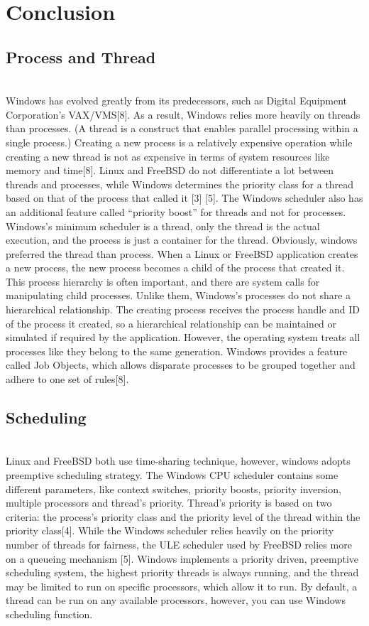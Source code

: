 \documentclass[10pt,draftclsnofoot,peerreview,letterpaper,onecolumn,]{IEEEtran}
\begin{document}
\section{Conclusion}
\subsection{Process and Thread}
~\\Windows has evolved greatly from its predecessors, such as Digital Equipment Corporation’s VAX/VMS[8].  As a result, Windows relies more heavily on threads than processes. (A thread is a construct that enables parallel processing within a single process.) Creating a new process is a relatively expensive operation while creating a new thread is not as expensive in terms of system resources like memory and time[8].  Linux and FreeBSD do not differentiate a lot between threads and processes, while Windows determines the priority class for a thread based on that of the process that called it [3] [5]. The Windows scheduler also has an additional feature called “priority boost” for threads and not for processes. Windows's minimum scheduler is a thread, only the thread is the actual execution, and the process is just a container for the thread. Obviously, windows preferred the thread than process. When a Linux or FreeBSD application creates a new process, the new process becomes a child of the process that created it. This process hierarchy is often important, and there are system calls for manipulating child processes. Unlike them, Windows's processes do not share a hierarchical relationship. The creating process receives the process handle and ID of the process it created, so a hierarchical relationship can be maintained or simulated if required by the application. However, the operating system treats all processes like they belong to the same generation. Windows provides a feature called Job Objects, which allows disparate processes to be grouped together and adhere to one set of rules[8].

\subsection{Scheduling}
~\\Linux and FreeBSD both use time-sharing technique, however, windows adopts preemptive scheduling strategy. The Windows CPU scheduler contains some different parameters, like context switches, priority boosts, priority inversion, multiple processors and thread's priority. Thread's priority is based on two criteria: the process's priority class and the priority level of the thread within the priority class[4].  While the Windows scheduler relies heavily on the priority number of threads for fairness, the ULE scheduler used by FreeBSD relies more on a queueing mechanism [5]. Windows implements a priority driven, preemptive scheduling system, the highest priority threads is always running, and the thread may be limited to run on specific processors, which allow it to run. By default, a thread can be run on any available processors, however, you can use Windows scheduling function.
\end{document}
